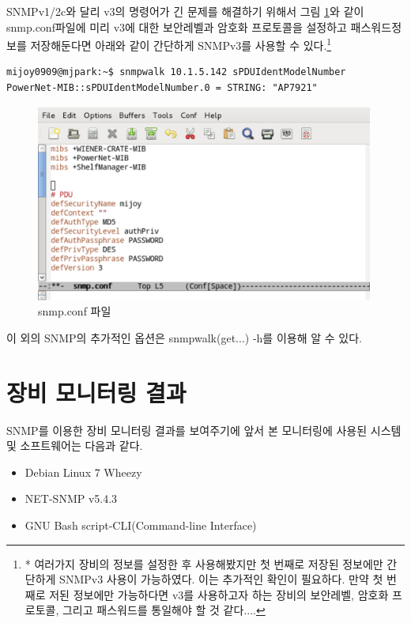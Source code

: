 \documentclass[11pt
  , a4paper
  , article
  , oneside
]{memoir}
\begin{document}
SNMPv1/2c와 달리 v3의 명령어가 긴 문제를 해결하기 위해서 그림 \ref{fig:snmp_conf}와 같이 snmp.conf파일에 미리 v3에 대한 보안레벨과 암호화 프로토콜을 설정하고 패스워드정보를 저장해둔다면 아래와 같이 간단하게 SNMPv3를 사용할 수 있다.\footnote{* 여러가지 장비의 정보를 설정한 후 사용해봤지만 첫 번째로 저장된 정보에만 간단하게 SNMPv3 사용이 가능하였다. 이는 추가적인 확인이 필요하다. 만약 첫 번째로 저된 정보에만 가능하다면 v3를 사용하고자 하는 장비의 보안레벨, 암호화 프로토콜, 그리고 패스워드를 통일해야 할 것 같다....}

\begin{lstlisting}[style=termstyle]
mijoy0909@mjpark:~$ snmpwalk 10.1.5.142 sPDUIdentModelNumber
PowerNet-MIB::sPDUIdentModelNumber.0 = STRING: "AP7921"
\end{lstlisting}


\begin{figure}[h]
  \centering
  \includegraphics[width=0.99\textwidth]{./images/snmp_conf.eps}
  \caption{snmp.conf 파일}
  \label{fig:snmp_conf}   
\end{figure}

이 외의 SNMP의 추가적인 옵션은 snmpwalk(get...) -h를 이용해 알 수 있다.


\clearpage
\section{장비 모니터링 결과}
SNMP를 이용한 장비 모니터링 결과를 보여주기에 앞서 본 모니터링에 사용된 시스템 및 소프트웨어는 다음과 같다.

\begin{itemize}
\item Debian Linux 7 Wheezy
\item NET-SNMP v5.4.3
\item GNU Bash script-CLI(Command-line Interface) 
\end{itemize}
\end{document}
